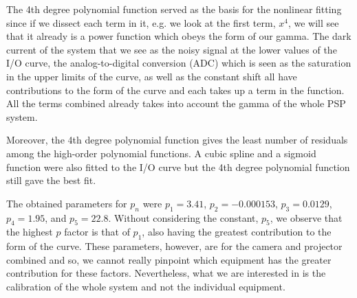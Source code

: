 The 4th degree polynomial function served as the basis for the nonlinear fitting since if we dissect each term in it, e.g. we look at the first term, $x^4$, we will see that it already is a power function which obeys the form of our gamma. The dark current of the system that we see as the noisy signal at the lower values of the I/O curve, the analog-to-digital conversion (ADC) which is seen as the saturation in the upper limits of the curve, as well as the constant shift all have contributions to the form of the curve and each takes up a term in the function. All the terms combined already takes into account the gamma of the whole PSP system. 

Moreover, the 4th degree polynomial function gives the least number of residuals among the high-order polynomial functions. A cubic spline and a sigmoid function were also fitted to the I/O curve but the 4th degree polynomial function still gave the best fit. 

The obtained parameters for $p_n$ were $p_1 = 3.41$, $p_2 = -0.000153$, $p_3 = 0.0129$, $p_4 = 1.95$, and $p_5 = 22.8$. Without considering the constant, $p_5$, we observe that the highest $p$ factor is that of $p_1$, also having the greatest contribution to the form of the curve. These parameters, however, are for the camera and projector combined and so, we cannot really pinpoint which equipment has the greater contribution for these factors. Nevertheless, what we are interested in is the calibration of the whole system and not the individual equipment.


